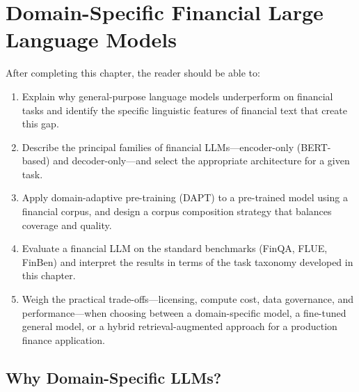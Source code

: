 \chapter{Domain-Specific Financial Large Language Models}
\label{ch:domain-specific-llms}

\begin{remark}
After completing this chapter, the reader should be able to:
\begin{enumerate}
  \item Explain why general-purpose language models underperform on financial tasks
        and identify the specific linguistic features of financial text that create
        this gap.
  \item Describe the principal families of financial LLMs---encoder-only (BERT-based)
        and decoder-only---and select the appropriate architecture for a given task.
  \item Apply domain-adaptive pre-training (DAPT) to a pre-trained model using a
        financial corpus, and design a corpus composition strategy that balances
        coverage and quality.
  \item Evaluate a financial LLM on the standard benchmarks (FinQA, FLUE, FinBen)
        and interpret the results in terms of the task taxonomy developed in this chapter.
  \item Weigh the practical trade-offs---licensing, compute cost, data governance,
        and performance---when choosing between a domain-specific model, a fine-tuned
        general model, or a hybrid retrieval-augmented approach for a production
        finance application.
\end{enumerate}
\end{remark}

\section{Why Domain-Specific LLMs?}
\label{sec:ch08-why-domain-specific}

